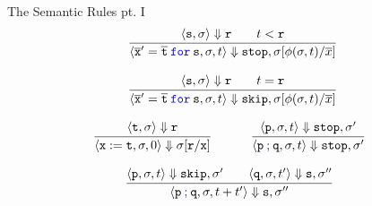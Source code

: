\documentclass{beamer}
\newcommand{\blue}[1]{\textcolor{blue}{#1}}
\begin{document}
\begin{frame}{The Semantic Rules pt. I}
        \[
                \infer{
                        \langle \overline{\mathtt{x}}' = \overline{\mathtt{t}} \> 
                        \blue{\mathtt{for}} \> \mathtt{s}, \sigma, t \rangle
                        \Downarrow \mathtt{stop}, \sigma[\phi(\sigma,t)/\overline{x}]
                }{
                        \langle \mathtt{s}, \sigma \rangle \Downarrow \mathtt{r}
                        \qquad t < \mathtt{r}
                }
        \]

        \[
                \infer{
                        \langle \overline{\mathtt{x}}' = \overline{\mathtt{t}} \> 
                        \blue{\mathtt{for}} \> \mathtt{s}, \sigma, t \rangle
                        \Downarrow \mathtt{skip}, \sigma[\phi(\sigma,t)/\overline{x}]
                }{
                        \langle \mathtt{s}, \sigma \rangle \Downarrow \mathtt{r}
                        \qquad t = \mathtt{r}
                }
        \]

        \[
                \infer[]{
                        \langle \mathtt{x := t}, \sigma,0 \rangle \Downarrow 
                        \sigma[\mathtt{r} / \mathtt{x}]
                }{
                       \langle \mathtt{t}, \sigma \rangle \Downarrow \mathtt{r}
                } \hspace{1cm}
                \infer[]{
                        \langle \mathtt{p \> \blue{;} \> q}, \sigma, t \rangle \Downarrow 
                        \mathtt{stop}, \sigma'
                }{
                        \langle \mathtt{p}, \sigma, t \rangle \Downarrow \mathtt{stop}, \sigma' 
                }
        \]

        \[
                \infer[]{
                        \langle \mathtt{p \> \blue{;} \> q}, \sigma, t + t' \rangle \Downarrow 
                        \mathtt{s}, \sigma''
                }{
                        \langle \mathtt{p}, \sigma, t \rangle \Downarrow \mathtt{skip}, \sigma' 
                        \qquad
                        \langle \mathtt{q}, \sigma, t' \rangle \Downarrow \mathtt{s}, \sigma''
                }
        \]
\end{frame}
\end{document}

